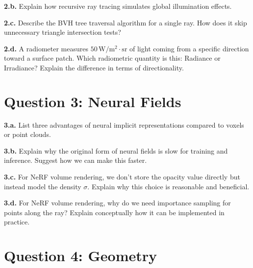 \documentclass[11pt]{article}
\begin{document}
\vspace{2cm}

\textbf{2.b.} Explain how recursive ray tracing simulates global illumination effects.

\vspace{2.5cm}

\textbf{2.c.} Describe the BVH tree traversal algorithm for a single ray. How does it skip unnecessary triangle intersection tests?

\vspace{2.5cm}

\textbf{2.d.} A radiometer measures $50\,\mathrm{W/m^2\!\cdot\!sr}$ of light coming from a specific direction toward a surface patch. Which radiometric quantity is this: Radiance or Irradiance? Explain the difference in terms of directionality.

\vspace{2.5cm}

\section*{Question 3: Neural Fields}

\textbf{3.a.} List three advantages of neural implicit representations compared to voxels or point clouds.

\vspace{2cm}

\textbf{3.b.} Explain why the original form of neural fields is slow for training and inference. Suggest how we can make this faster.

\vspace{2.5cm}

\textbf{3.c.} For NeRF volume rendering, we don't store the opacity value directly but instead model the density $\sigma$. Explain why this choice is reasonable and beneficial.

\vspace{2.5cm}

\textbf{3.d.} For NeRF volume rendering, why do we need importance sampling for points along the ray? Explain conceptually how it can be implemented in practice.

\vspace{2.5cm}

\section*{Question 4: Geometry}
\end{document}
